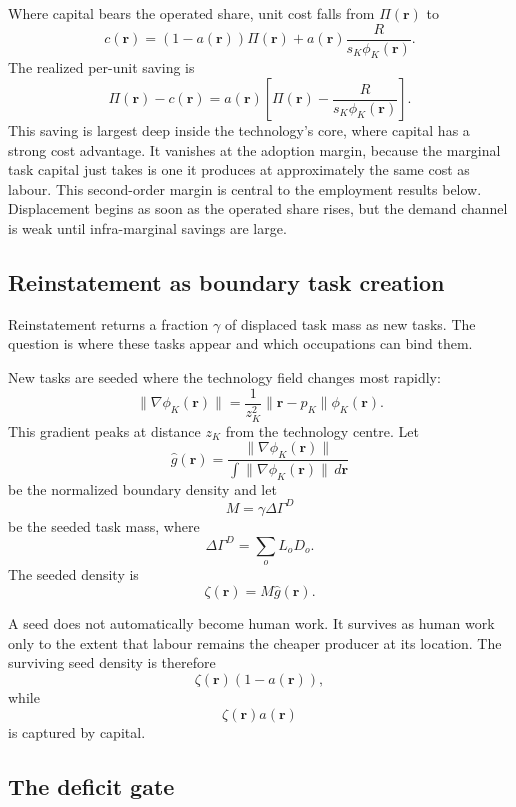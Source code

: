 \documentclass[12pt, a4paper]{article}
\begin{document}
Where capital bears the operated share, unit cost falls from
$\Pi(\mathbf{r})$ to
\begin{equation}
  c(\mathbf{r})
  =
  (1-a(\mathbf{r}))\Pi(\mathbf{r})
  +
  a(\mathbf{r})
  \frac{R}{s_K\phi_K(\mathbf{r})}.
  \label{eq:unit-cost}
\end{equation}
The realized per-unit saving is
\[
  \Pi(\mathbf{r}) - c(\mathbf{r})
  =
  a(\mathbf{r})
  \left[
    \Pi(\mathbf{r})
    -
    \frac{R}{s_K\phi_K(\mathbf{r})}
  \right].
\]
This saving is largest deep inside the technology's core, where capital
has a strong cost advantage. It vanishes at the adoption margin, because
the marginal task capital just takes is one it produces at approximately
the same cost as labour. This second-order margin is central to the
employment results below. Displacement begins as soon as the operated
share rises, but the demand channel is weak until infra-marginal savings
are large.

\subsection{Reinstatement as boundary task creation}
\label{sec:reinstatement}

Reinstatement returns a fraction $\gamma$ of displaced task mass as new
tasks. The question is where these tasks appear and which occupations
can bind them.

New tasks are seeded where the technology field changes most rapidly:
\begin{equation}
  \|\nabla\phi_K(\mathbf{r})\|
  =
  \frac{1}{z_K^2}
  \|\mathbf{r}-p_K\|
  \phi_K(\mathbf{r}).
  \label{eq:gradient-phi}
\end{equation}
This gradient peaks at distance $z_K$ from the technology centre. Let
\[
  \hat g(\mathbf{r})
  =
  \frac{
    \|\nabla\phi_K(\mathbf{r})\|
  }{
    \int \|\nabla\phi_K(\mathbf{r})\|\,d\mathbf{r}
  }
\]
be the normalized boundary density and let
\[
  M = \gamma \Delta\Gamma^D
\]
be the seeded task mass, where
\[
  \Delta\Gamma^D = \sum_o L_o D_o.
\]
The seeded density is
\[
  \zeta(\mathbf{r}) = M\hat g(\mathbf{r}).
\]

A seed does not automatically become human work. It survives as human
work only to the extent that labour remains the cheaper producer at its
location. The surviving seed density is therefore
\[
  \zeta(\mathbf{r})(1-a(\mathbf{r})),
\]
while
\[
  \zeta(\mathbf{r})a(\mathbf{r})
\]
is captured by capital.

\subsection{The deficit gate}
\label{sec:deficit-gate}
\end{document}
